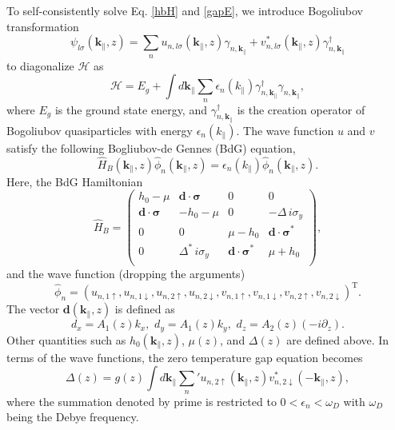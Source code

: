 \documentclass[11pt]{report}
\newcommand{\kperp}{\mathbf{k}_\parallel}
\begin{document}
To self-consistently solve Eq. \eqref{hbH} and \eqref{gapE}, we introduce
Bogoliubov transformation
\begin{equation}
 \psi_{l \sigma}(\mathbf{k}_\parallel,z) = \sum_n  u_{n,l \sigma} (\kperp, z) \gamma_{n,\kperp} + v^\ast_{n,l \sigma} (\kperp, z) \gamma_{n,\kperp}^\dagger
\end{equation}
to diagonalize $\mathcal{H}$ as
\begin{equation}
\mathcal{H} = E_g + \int d \kperp\sum_n \epsilon_n(k_\parallel) \gamma_{n,\kperp}^\dagger \gamma_{n,\kperp} ,
\end{equation}
where $E_g$ is the ground state energy, and $\gamma_{n,\kperp}^\dagger$
is the creation operator of Bogoliubov quasiparticles with energy $\epsilon_n(k_\parallel)$.
The wave function $u$ and $v$ satisfy the following Bogliubov-de Gennes (BdG) equation,
\begin{equation}
\hat{H}_{B}(\mathbf{k}_\parallel,z) \hat{\phi}_n(\mathbf{k}_\parallel,z)=\epsilon_n(k_\parallel)\hat{\phi}_n (\mathbf{k}_\parallel,z).
\label{bdgsimp}
\end{equation}
Here, the BdG Hamiltonian
\begin{equation}
\hat{H}_{B}=\left( \begin{array}{cccc}
h_0 -\mu  & \mathbf{d} \cdot \boldsymbol{\sigma}&0&0\\ 
 \mathbf{d} \cdot \boldsymbol{\sigma} &-h_0 -\mu &0&-\Delta\, i\sigma_y\\ 
0 &0& \mu -h_0 & \mathbf{d} \cdot \boldsymbol{\sigma}^* \\
0 &\Delta^{\ast} \, i\sigma_y & \mathbf{d} \cdot \boldsymbol{\sigma}^* & \mu+h_0\\ 
 \end{array} \right), \label{bdgH} 
\end{equation}
and the wave function (dropping the arguments)
\begin{equation}
\hat{\phi}_n=(u_{n,1\uparrow}, u_{n,1\downarrow}, u_{n,2\uparrow}, u_{n,2\downarrow}, 
v_{n,1\uparrow}, v_{n,1\downarrow}, v_{n,2\uparrow}, v_{n,2\downarrow})^\mathrm{T}.
\end{equation}
The vector $\mathbf{d}(\mathbf{k}_\parallel,z)$ is defined as
\begin{equation}
d_x=A_1(z)k_x,\,\, d_y=A_1(z)k_y,\,\, d_z=A_2(z)(-i\partial_z).
\end{equation} 
Other quantities such as $h_0(\mathbf{k}_\parallel,z)$, $\mu(z)$, and $\Delta(z)$ are 
defined above.
In terms of the wave functions, the zero temperature gap equation becomes
\begin{equation}
\Delta(z) = g(z) \int d \mathbf{k}_\parallel \sum_n' u_{n,2 \uparrow}(\mathbf{k}_\parallel,z) v^*_{n,2\downarrow}(-\mathbf{k}_\parallel,z) ,
\end{equation}
where the summation denoted by prime is restricted to $0<\epsilon_n<\omega_D$ with 
$\omega_D$ being the Debye frequency.
\end{document}
